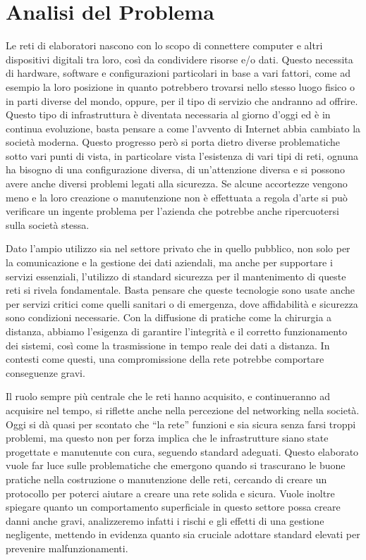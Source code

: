 \newpage
   \section{Analisi del Problema}
    Le reti di elaboratori nascono con lo scopo di connettere computer e altri dispositivi digitali tra loro, così da condividere risorse e/o dati. Questo necessita di hardware, software e configurazioni particolari in base a vari fattori, come ad esempio la loro posizione in quanto potrebbero trovarsi nello stesso luogo fisico o in parti diverse del mondo, oppure, per il tipo di servizio che andranno ad offrire.
    Questo tipo di infrastruttura è diventata necessaria al giorno d'oggi ed è in continua evoluzione, basta pensare a come l'avvento di Internet abbia cambiato la società moderna.
    Questo progresso però si porta dietro diverse problematiche sotto vari punti di vista, in particolare vista l'esistenza di vari tipi di reti, ognuna ha bisogno di una configurazione diversa, di un'attenzione diversa e si possono avere anche diversi problemi legati alla sicurezza. Se alcune accortezze vengono meno e la loro creazione o manutenzione non è effettuata a regola d'arte si può verificare un ingente problema per l'azienda che potrebbe anche ripercuotersi sulla società stessa.

    \vspace{3mm} %
    
    Dato l'ampio utilizzo sia nel settore privato che in quello pubblico, non 
    solo per la comunicazione e la gestione dei dati aziendali, ma anche per 
    supportare i servizi essenziali, l'utilizzo di standard sicurezza per il mantenimento di queste reti si rivela fondamentale.
    Basta pensare che queste tecnologie sono usate anche per servizi critici come quelli sanitari o di emergenza, dove affidabilità e sicurezza sono condizioni necessarie.
    Con la diffusione di pratiche come la chirurgia a distanza, abbiamo l'esigenza di garantire l'integrità e il corretto funzionamento dei sistemi, così come la trasmissione in tempo reale dei dati a distanza. In contesti come questi, una compromissione della rete potrebbe comportare conseguenze gravi.
    
    \vspace{3mm} %

   Il ruolo sempre più centrale che le reti hanno acquisito, e continueranno ad acquisire nel tempo, si riflette anche nella percezione del networking nella società. Oggi si dà quasi per scontato che “la rete” funzioni e sia sicura senza farsi troppi problemi, ma questo non per forza implica che le infrastrutture siano state progettate e manutenute con cura, seguendo standard adeguati.
   Questo elaborato vuole far luce sulle problematiche che emergono quando si
   trascurano le buone pratiche nella costruzione o manutenzione delle reti, cercando
   di creare un protocollo per poterci aiutare a creare una rete solida e sicura. Vuole inoltre spiegare quanto un comportamento superficiale in questo settore possa creare danni anche gravi, analizzeremo infatti i rischi e gli effetti di una gestione negligente, mettendo in evidenza quanto sia cruciale adottare standard elevati per prevenire malfunzionamenti.

